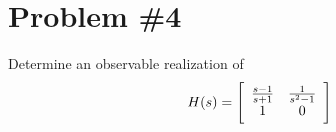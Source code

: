 \documentclass{article}
\begin{document}
\pagebreak

\section*{Problem \#4}
Determine an observable realization of
$$
H(s) =
\left[\begin{array}{c c}
  \frac{s-1}{s+1} & \frac{1}{s^2 - 1} \\
  1               & 0
\end{array}\right]
$$
\end{document}

